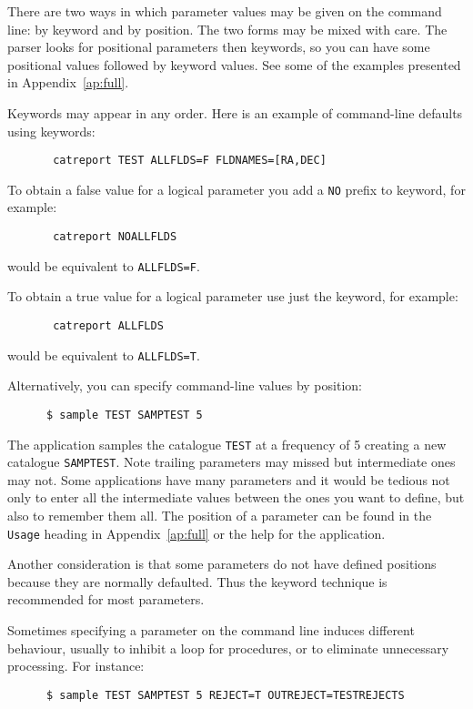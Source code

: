 There are two ways in which parameter values may be given on the
command line: by keyword and by position. The two forms may be
mixed with care. The parser looks for positional parameters then
keywords, so you can have some positional values followed by keyword
values.  See some of the examples presented in Appendix~\ref{ap:full}.

Keywords may appear in any order.
Here is an example of command-line defaults using keywords: 
\begin{verbatim}
       catreport TEST ALLFLDS=F FLDNAMES=[RA,DEC]
\end{verbatim}

To obtain a false value for a logical parameter
you add a {\tt NO} prefix to keyword, for example:
\begin{verbatim}
       catreport NOALLFLDS
\end{verbatim}
would be equivalent to {\tt ALLFLDS=F}.

To obtain a true value for a logical parameter use just the keyword, 
for example:
\begin{verbatim}
       catreport ALLFLDS
\end{verbatim}
would be equivalent to {\tt ALLFLDS=T}.

Alternatively, you can specify command-line values by position:
\begin{verbatim}
      $ sample TEST SAMPTEST 5
\end{verbatim}
The application samples the catalogue {\tt TEST} at a frequency of 5 creating 
a new catalogue {\tt SAMPTEST}. Note
trailing parameters may missed but
intermediate ones may not.  Some applications have many parameters and
it would be tedious not only to enter all the intermediate values
between the ones you want to define, but also to remember them all. The
position of a parameter can be found in the {\tt Usage} heading
in Appendix~\ref{ap:full} or the help for the application.

Another consideration is that some parameters do not have defined positions
because they are normally defaulted. Thus the keyword technique is
recommended for most parameters. 

Sometimes specifying a parameter on the command line induces different
behaviour, usually to inhibit a loop for procedures, or to eliminate
unnecessary processing.
For instance:

\begin{verbatim}
      $ sample TEST SAMPTEST 5 REJECT=T OUTREJECT=TESTREJECTS
\end{verbatim}


